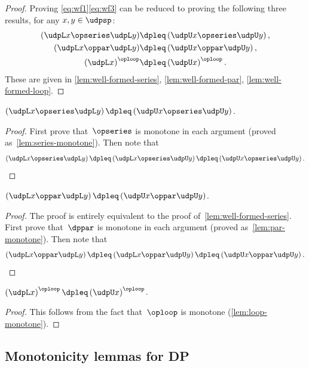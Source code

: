 \begin{proof}
    Proving \cref{eq:wf1}\textemdash \cref{eq:wf3} can be
    reduced to proving the following three results, for any $x,y\in\udpsp$:
    \begin{align*}
        \left(\udpL x\opseries\udpL y\right) & \dpleq\left(\udpU x\opseries\udpU y\right),\\
        \left(\udpL x\oppar\udpL y\right) & \dpleq\left(\udpU x\oppar\udpU y\right),\\
        \left(\udpL x\right)^{\oploop} & \dpleq\left(\udpU x\right)^{\oploop}.
    \end{align*}
    These are given in \cref{lem:well-formed-series}, \cref{lem:well-formed-par},
    \cref{lem:well-formed-loop}.
\end{proof}
\begin{lemma}
    \label{lem:well-formed-series}$\left(\udpL x\opseries\udpL y\right)\dpleq\left(\udpU x\opseries\udpU y\right)$.
\end{lemma}
\begin{proof}
    First prove that~$\opseries$ is monotone in each argument (proved
    as~\cref{lem:series-monotone}). Then note that
    \[
        \left(\udpL x\opseries\udpL y\right)\dpleq\left(\udpL x\opseries\udpU y\right)\dpleq\left(\udpU x\opseries\udpU y\right).
    \]
\end{proof}
\begin{lemma}
    \label{lem:well-formed-par}$\left(\udpL x\oppar\udpL y\right)\dpleq\left(\udpU x\oppar\udpU y\right)$.
\end{lemma}
\begin{proof}
    The proof is entirely equivalent to the proof of~\cref{lem:well-formed-series}.
    First prove that~$\dppar$ is monotone in each argument (proved as~\cref{lem:par-monotone}).
    Then note that~
    \[
        \left(\udpL x\oppar\udpL y\right)\dpleq\left(\udpL x\oppar\udpU y\right)\dpleq\left(\udpU x\oppar\udpU y\right).
    \]
\end{proof}

\begin{lemma}
    \label{lem:well-formed-loop}$\left(\udpL x\right)^{\oploop}\dpleq\left(\udpU x\right)^{\oploop}$.
\end{lemma}
\begin{proof}
    This follows from the fact that~$\oploop$ is monotone (\cref{lem:loop-monotone}).
\end{proof}

\subsection{Monotonicity lemmas for DP}

